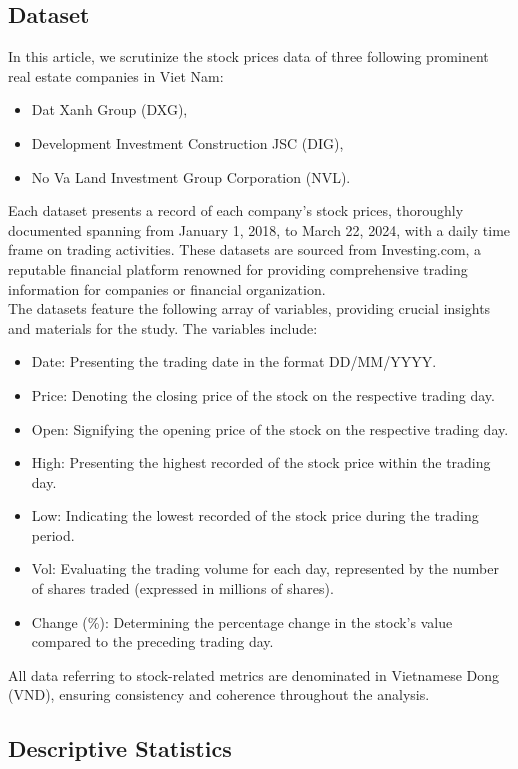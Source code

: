 \documentclass[conference]{IEEEtran}
\begin{document}
\subsection{Dataset}\label{AA}
In this article, we scrutinize the stock prices data of three following prominent real estate companies in Viet Nam:
\begin{itemize}
    \item Dat Xanh Group (DXG), 
    \item Development Investment Construction JSC (DIG),
    \item No Va Land Investment Group Corporation (NVL).
\end{itemize}
Each dataset presents a record of each company's stock prices, thoroughly documented spanning from January 1, 2018, to March 22, 2024, with a daily time frame on trading activities. These datasets are sourced from Investing.com, a reputable financial platform renowned for providing comprehensive trading information for companies or financial organization.\\
The datasets feature the following array of variables, providing crucial insights and materials for the study. The variables include:
\begin{itemize}
    \item Date: Presenting the trading date in the format DD/MM/YYYY.
    \item Price: Denoting the closing price of the stock on the respective trading day.
    \item Open: Signifying the opening price of the stock on the respective trading day.
    \item High: Presenting the highest recorded of the stock price within the trading day.
    \item Low: Indicating the lowest recorded of the stock price during the trading period.
    \item Vol: Evaluating the trading volume for each day, represented by the number of shares traded (expressed in millions of shares).
    \item Change (\%): Determining the percentage change in the stock's value compared to the preceding trading day.
\end{itemize}
All data referring to stock-related metrics are denominated in Vietnamese Dong (VND), ensuring consistency and coherence throughout the analysis.

\subsection{Descriptive Statistics}
\end{document}
